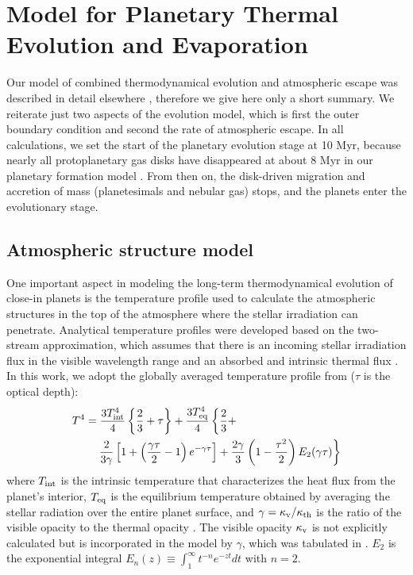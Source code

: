 \documentclass[]{emulateapj}
\def\tint{T_{\rm int}}
\def\teq{T_{\rm eq}}
\begin{document}
\section{Model for Planetary Thermal Evolution and Evaporation}\label{model}
Our model of combined thermodynamical evolution and atmospheric escape was described in detail elsewhere \citep{Mordasini2012a,Jin2014}, therefore we give here only  a short summary. We reiterate just two aspects of the evolution model, which is first the outer boundary condition and second the rate of atmospheric escape. In all calculations, we set the start of the planetary evolution stage at 10 Myr, because nearly all protoplanetary gas disks have disappeared at about 8 Myr  in our planetary formation model \citep{Alibert2005,Mordasini2012a,Mordasini2012b,Mordasini2014ija}. From then on, the disk-driven migration and accretion of mass (planetesimals and nebular gas) stops, and the planets enter the evolutionary stage.  

\subsection{{Atmospheric structure model}}
One important aspect in modeling the long-term thermodynamical evolution of close-in planets is the temperature profile used to calculate the atmospheric structures in the top of the atmosphere where the stellar irradiation can penetrate.
Analytical temperature profiles were developed based on the two-stream approximation, which assumes that there is an incoming stellar irradiation flux in the visible wavelength range and an absorbed and intrinsic thermal flux \citep{Hubeny2003,Hansen2008,Guillot2010,Heng2012,Robinson2012,Parmentier2014,Heng2014}.
In this work, we adopt the globally averaged temperature profile from \citet{Guillot2010} ($\tau$ is the optical depth):
\begin{equation}
  \begin{split}
    T^4 &={3\tint^4\over 4}\left\{{2\over 3}+\tau\right\}+ {3\teq^4\over 4}\left\{{2\over 3}+\right.\\
    & \quad \left. {2\over 3\gamma}\left[1+\left({\gamma\tau\over 2}-1\right)e^{-\gamma\tau}\right]+ {2\gamma\over 3}\left(1-{\tau^2\over 2}\right)E_2(\gamma\tau)\right\}
  \end{split}
 \label{2bdglobal}
\end{equation}
where $\tint$ is the intrinsic temperature that characterizes the heat flux from the planet's interior,
$\teq$ is the equilibrium temperature obtained by averaging the stellar radiation over the entire planet surface, and
$\gamma=\kappa_{\rm v}/\kappa_{\rm th}$ is the ratio of the visible opacity to the thermal opacity \citep{Guillot2010}.
The visible opacity $\kappa_{\rm v}$ is not explicitly calculated but is incorporated in the model by $\gamma$, which was tabulated in \citet{Jin2014}. $E_2$ is the exponential integral $E_n(z)\equiv\int_1^\infty t^{-n}e^{-zt}dt$ with $n=2$.
\end{document}
